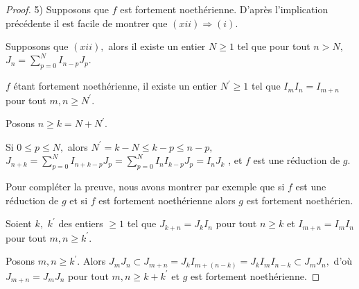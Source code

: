 \begin{proof}
	5) Supposons que $f$ est fortement noethérienne. D'après
	l'implication précédente il est facile de montrer que $(xii)\Longrightarrow (i).$
	
	Supposons que $(xii),$ alors il existe un entier $N\geq 1$ tel que pour tout $n>N,$ $J_{n}=\sum\limits_{p=0}^{N}I_{n-p}J_{p}.$
	
	$f$ étant fortement noethérienne, il existe un entier $N^{\prime}\geq 1$ tel que $I_{m}I_{n}=I_{m+n}$ pour tout $m,n\geq N^{\prime }.$
	
	Posons $n\geq k=N+N^{\prime }.$
	
	Si $0\leq p\leq N,$ alors $N^{\prime }=k-N\leq k-p\leq n-p,$ $J_{n+k}=\sum\limits_{p=0}^{N}I_{n+k-p}J_{p}=\sum\limits_{p=0}^{N}I_{n}I_{k-p}J_{p}=I_{n}J_{k}$ , et $f$ est une réduction de $g.$
	
	Pour compléter la preuve, nous avons montrer par exemple que si $f$ est une réduction de $g$ et si $f$ est fortement noethérienne alors $g$ est fortement noethérien.
	
	Soient $k,$ $k^{\prime }$ des entiers $\geq 1$ tel que $J_{k+n}=J_{k}I_{n}$
	pour tout $n\geq k$ et $I_{m+n}=I_{m}I_{n}$ pour tout $m,n\geq k^{\prime }.$
	
	Posons $m,n\geq k^{\prime }.$ Alors $J_{m}J_{n}\subset
	J_{m+n}=J_{k}I_{m+(n-k)}=J_{k}I_{m}I_{n-k}\subset J_{m}J_{n},$ d'où $J_{m+n}=J_{m}J_{n}$ pour tout $m,n\geq k+k^{\prime }$ et $g$ est fortement noethérienne.
\end{proof}